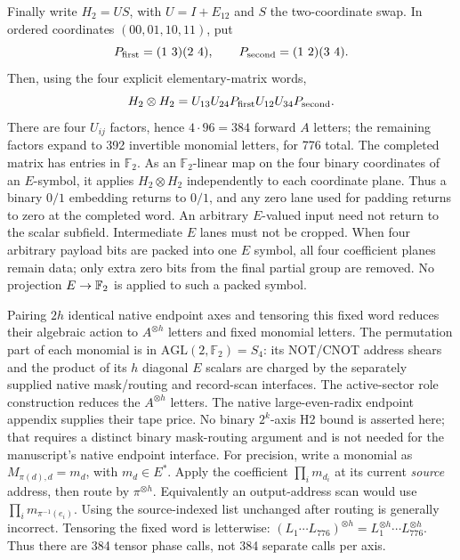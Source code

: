 Finally write $H_2=US$, with $U=I+E_{12}$ and $S$ the two-coordinate
swap. In ordered coordinates $(00,01,10,11)$, put
\[
 P_{\rm first}=(1\ 3)(2\ 4),\qquad
 P_{\rm second}=(1\ 2)(3\ 4).
\]
Then, using the four explicit elementary-matrix words,
\begin{equation}
 H_2\otimes H_2
 =U_{13}U_{24}P_{\rm first}U_{12}U_{34}P_{\rm second}.       \label{eq:positive-25}
\end{equation}
There are four $U_{ij}$ factors, hence $4\cdot96=384$ forward $A$
letters; the remaining factors expand to 392 invertible monomial
letters, for 776 total. The completed matrix has entries in $\mathbb F_2$.
As an $\mathbb F_2$-linear map on the four binary coordinates of an
$E$-symbol, it applies $H_2\otimes H_2$ independently to each coordinate
plane. Thus a binary $0/1$ embedding returns to $0/1$, and any zero lane
used for padding returns to zero at the completed word. An arbitrary
$E$-valued input need not return to the scalar subfield. Intermediate
$E$ lanes must not be cropped.
When four arbitrary payload bits are packed into one $E$ symbol,
all four coefficient planes remain data; only extra zero bits from
the final partial group are removed. No projection $E\to\mathbb F_2$
is applied to such a packed symbol.

Pairing $2h$ identical native endpoint axes and tensoring this fixed word
reduces their algebraic action to $A^{\otimes h}$ letters and fixed
monomial letters. The permutation part of each monomial is in
$\mathrm{AGL}(2,\mathbb F_2)=S_4$: its NOT/CNOT address shears and the
product of its $h$ diagonal $E$ scalars are charged by the separately
supplied native mask/routing and record-scan interfaces. The active-sector
role construction reduces the $A^{\otimes h}$ letters. The native
large-even-radix endpoint appendix supplies their tape price. No binary
$2^k$-axis H2 bound is asserted here; that requires a distinct binary
mask-routing argument and is not needed for the manuscript's native
endpoint interface.
For precision, write a monomial as $M_{\pi(d),d}=m_d$, with
$m_d\in E^*$. Apply the coefficient $\prod_i m_{d_i}$ at its current
\emph{source} address, then route by $\pi^{\otimes h}$. Equivalently
an output-address scan would use $\prod_i m_{\pi^{-1}(e_i)}$.
Using the source-indexed list unchanged after routing is generally
incorrect. Tensoring the fixed word is letterwise:
$(L_1\cdots L_{776})^{\otimes h}
 =L_1^{\otimes h}\cdots L_{776}^{\otimes h}$.
Thus there are 384 tensor phase calls, not 384 separate calls per axis.

